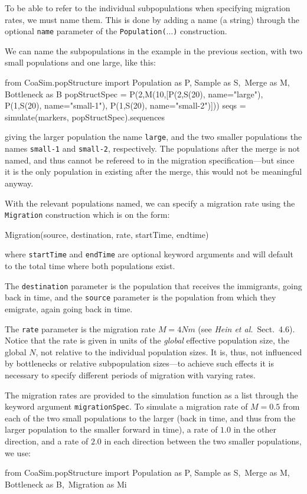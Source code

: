 \documentclass{manual}
\begin{document}
\begin{empfile}
To be able to refer to the individual subpopulations when specifying
migration rates, we must name them.  This is done by adding a name (a
string) through the optional \texttt{name} parameter of the
\texttt{Population($\ldots$)} construction.

We can name the subpopulations in the example in the previous section,
with two small populations and one large, like this:
\begin{code}
from CoaSim.popStructure import Population as P, Sample as S,\
                                Merge as M, Bottleneck as B
popStructSpec = P(2,M(10,[P(2,S(20), name="large"),
                          P(1,S(20), name="small-1"),
                          P(1,S(20), name="small-2")]))
seqs = simulate(markers, popStructSpec).sequences
\end{code}
giving the larger population the name \texttt{large}, and the two
smaller populations the names \texttt{small-1} and \texttt{small-2},
respectively.  The populations after the merge is not named, and thus
cannot be refereed to in the migration specification---but since it is
the only population in existing after the merge, this would not be
meaningful anyway.

With the relevant populations named, we can specify a migration rate
using the \texttt{Migration} construction which is on the form:
\begin{code}
Migration(source, destination, rate, startTime, endtime)
\end{code}
where \texttt{startTime} and \texttt{endTime} are optional keyword
arguments and will default to the total time where both populations
exist.

The \texttt{destination} parameter is the population that receives the
immigrants, going back in time, and the \texttt{source} parameter is
the population from which they emigrate, again going back in time.

The \texttt{rate} parameter is the migration rate $M=4Nm$ (see
\emph{Hein et al.}\ Sect.~4.6).  Notice that the rate is given in
units of the \emph{global} effective population size, the global $N$,
not relative to the individual population sizes.  It is, thus, not
influenced by bottlenecks or relative subpopulation sizes---to achieve
such effects it is necessary to specify different periods of migration
with varying rates.

The migration rates are provided to the simulation function as a list
through the keyword argument \texttt{migrationSpec}.  To simulate a
migration rate of $M=0.5$ from each of the two small populations to
the larger (back in time, and thus from the larger population to the
smaller forward in time), a rate of $1.0$ in the other direction, and
a rate of $2.0$ in each direction between the two smaller populations,
we use:
\begin{code}
from CoaSim.popStructure import Population as P, Sample as S,\
                                Merge as M, Bottleneck as B,\
                                Migration as Mi


\end{code}
\end{empfile}
\end{document}
